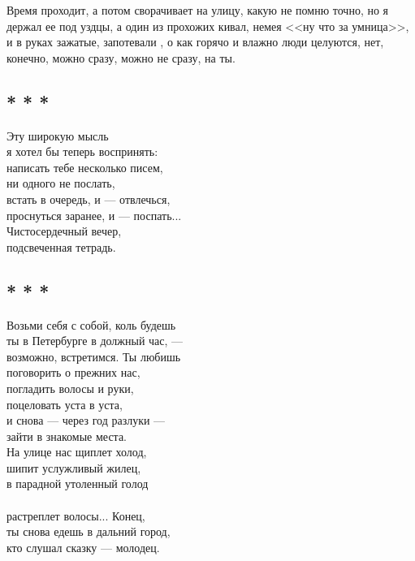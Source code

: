 \documentclass[12pt,a5paper]{report}
\begin{document}
Время проходит, а потом сворачивает на улицу, какую не помню точно, но я держал ее под уздцы, а один из прохожих кивал, немея <<ну что за умница>>, и в руках зажатые, запотевали , о как горячо и влажно люди целуются, нет, конечно, можно сразу, можно не сразу, на ты.\\
\newpage




\subsection[<<Эту широкую мысль...>>]{* * *}
Эту широкую мысль \\
я хотел бы теперь воспринять:\\

написать тебе несколько писем, \\
ни одного не послать,\\

встать в очередь, и --- отвлечься, \\
проснуться заранее, и --- поспать...\\

Чистосердечный вечер,\\  %
подсвеченная тетрадь.\\
\newpage


\subsection[<<Возьми себя с собой...>>]{* * *}
Возьми себя с собой, коль будешь \\
ты в Петербурге в должный час, — \\
возможно, встретимся. Ты любишь \\
поговорить о прежних нас, \\

погладить волосы и руки, \\
поцеловать уста в уста, \\
и снова --- через год разлуки --- \\
зайти в знакомые места. \\

На улице нас щиплет холод, \\
шипит услужливый жилец, \\
в парадной утоленный голод \\
\\
растреплет волосы... Конец, \\
ты снова едешь в дальний город,\\ 
кто слушал сказку — молодец.\\
\newpage
\end{document}
